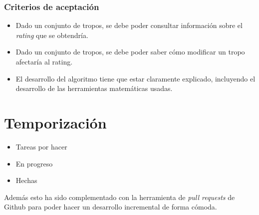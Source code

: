 \subsubsection{Criterios de aceptación}

\begin{itemize}
      \item Dado un conjunto de tropos, se debe poder consultar información sobre el \textit{rating} que se obtendría.
      \item Dado un conjunto de tropos, se debe poder saber cómo modificar un tropo afectaría al rating.
      \item El desarrollo del algoritmo tiene que estar claramente explicado, incluyendo el desarrollo de las herramientas matemáticas usadas.
\end{itemize}

\section{Temporización}
\begin{itemize}
    \item Tareas por hacer
    \item En progreso
    \item Hechas
\end{itemize}

Además esto ha sido complementado con la herramienta de \textit{pull requests} de Github para poder hacer
un desarrollo incremental de forma cómoda.
